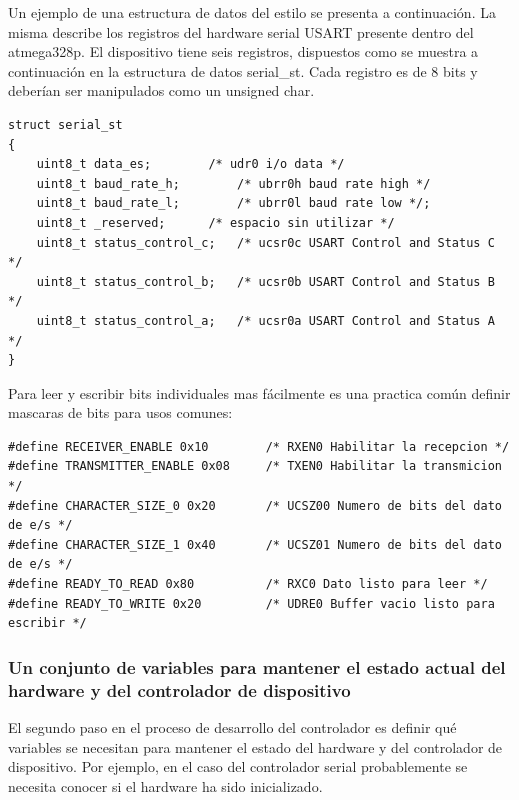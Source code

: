 \documentclass[output=paper, 
colorlinks,
citecolor=brown,
newtxmath
]{langscibook}
\begin{document}
Un ejemplo de una estructura de datos del estilo se presenta a continuación.
La misma describe los registros del hardware serial USART presente dentro
del atmega328p. El dispositivo tiene seis registros, dispuestos como se muestra
a continuación en la estructura de datos serial\_st. Cada registro es de 
8 bits y deberían ser manipulados como un unsigned char.

\begin{small}
\begin{verbatim}
struct serial_st
{
    uint8_t data_es;		/* udr0 i/o data */
    uint8_t baud_rate_h;    	/* ubrr0h baud rate high */
    uint8_t baud_rate_l;    	/* ubrr0l baud rate low */;
    uint8_t _reserved;    	/* espacio sin utilizar */
    uint8_t status_control_c;   /* ucsr0c USART Control and Status C */
    uint8_t status_control_b;   /* ucsr0b USART Control and Status B */
    uint8_t status_control_a;   /* ucsr0a USART Control and Status A */
}
\end{verbatim}
\end{small}


Para leer y escribir bits individuales mas fácilmente es una practica común
definir mascaras de bits para usos comunes:

\begin{small}
\begin{verbatim}
#define RECEIVER_ENABLE 0x10        /* RXEN0 Habilitar la recepcion */
#define TRANSMITTER_ENABLE 0x08     /* TXEN0 Habilitar la transmicion */
#define CHARACTER_SIZE_0 0x20       /* UCSZ00 Numero de bits del dato de e/s */
#define CHARACTER_SIZE_1 0x40       /* UCSZ01 Numero de bits del dato de e/s */
#define READY_TO_READ 0x80          /* RXC0 Dato listo para leer */
#define READY_TO_WRITE 0x20         /* UDRE0 Buffer vacio listo para escribir */
\end{verbatim}
\end{small}


\subsubsection*{Un conjunto de variables para mantener el estado actual del hardware
y del controlador de dispositivo}

El segundo paso en el proceso de desarrollo del controlador es definir
qué variables se necesitan para mantener el estado del hardware y 
del controlador de dispositivo. Por ejemplo, en el caso del controlador 
serial probablemente se necesita conocer si el
hardware ha sido inicializado.
\end{document}
